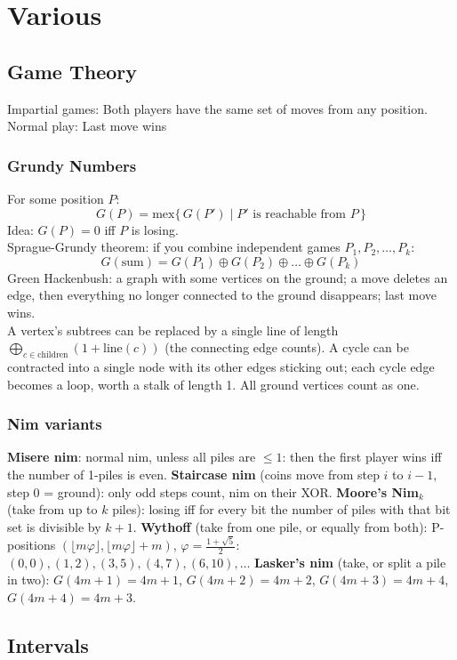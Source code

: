 \chapter{Various}

\section{Game Theory}
	Impartial games: Both players have the same set of moves from any position.
	Normal play: Last move wins
	\subsection{Grundy Numbers}
	For some position $P$:    
	\[
		G(P) = \mathrm{mex}\{\, G(P') \mid P' \text{ is reachable from } P \,\} 
	\]
	Idea: $G(P) = 0$ iff $P$ is losing. \\
	Sprague-Grundy theorem: if you combine independent games $P_1, P_2, \dots, P_k$: 
	\[
		G(\text{sum}) = G(P_1) \oplus G(P_2) \oplus \dots \oplus G(P_k)
	\]
	Green Hackenbush: a graph with some vertices on the ground; a move deletes an edge, then everything no longer connected to the ground disappears; last move wins. \\
	A vertex's subtrees can be replaced by a single line of length $\bigoplus_{c \in \text{children}} (1 + \text{line}(c))$ (the connecting edge counts). A cycle can be contracted into a single node with its other edges sticking out; each cycle edge becomes a loop, worth a stalk of length 1. All ground vertices count as one. 

	\subsection{Nim variants}
	\textbf{Misere nim}: normal nim, unless all piles are $\le1$: then the first player wins iff the number of 1-piles is even.
	\textbf{Staircase nim} (coins move from step $i$ to $i-1$, step 0 = ground): only odd steps count, nim on their XOR.
	\textbf{Moore's Nim$_k$} (take from up to $k$ piles): losing iff for every bit the number of piles with that bit set is divisible by $k+1$.
	\textbf{Wythoff} (take from one pile, or equally from both): P-positions $(\lfloor m\varphi\rfloor,\lfloor m\varphi\rfloor+m)$, $\varphi=\frac{1+\sqrt5}2$: $(0,0),(1,2),(3,5),(4,7),(6,10),\dots$
	\textbf{Lasker's nim} (take, or split a pile in two): $G(4m{+}1)=4m{+}1$, $G(4m{+}2)=4m{+}2$, $G(4m{+}3)=4m{+}4$, $G(4m{+}4)=4m{+}3$.

\section{Intervals}

